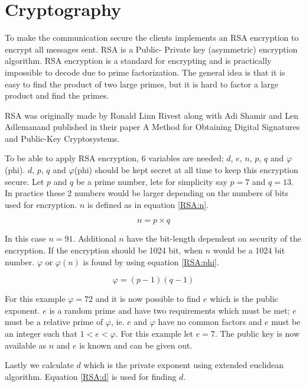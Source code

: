 \section{Cryptography}

To make the communication secure the clients implements an RSA encryption to encrypt all messages sent. RSA is a Public- Private key (asymmetric) encryption algorithm. RSA encryption is a standard for encrypting and is practically impossible to decode due to prime factorization. The general idea is that it is easy to find the product of two large primes, but it is hard to factor a large product and find the primes.

RSA was originally made by Ronald Linn Rivest along with Adi Shamir and Len Adlemanand published in their paper A Method for Obtaining Digital Signatures and Public-Key Cryptosystems\cite{RSA}.

To be able to apply RSA encryption, 6 variables are needed; $d$, $e$, $n$, $p$, $q$ and $\varphi$(phi). $d$, $p$, $q$ and $\varphi$(phi) should be kept secret at all time to keep this encryption secure. Let $p$ and $q$ be a prime number, lets for simplicity say $p=7$ and $q=13$. In practice these 2 numbers would be larger depending on the numbers of bits used for encryption. $n$ is defined as in equation \ref{RSA:n}.

\begin{equation}
n = p \times q
\label{RSA:n}
\end{equation}

In this case $n=91$. Additional $n$ have the bit-length dependent on security of the encryption. If the encryption should be 1024 bit, when $n$ would be a 1024 bit number. $\varphi$ or $\varphi(n)$ is found by using equation \ref{RSA:phi}.

\begin{equation}
\varphi = (p-1)(q-1)
\label{RSA:phi}
\end{equation}

For this example $\varphi = 72$ and it is now possible to find $e$ which is the public exponent. $e$ is a random prime and have two requirements which must be met; $e$ must be a relative prime of $\varphi$, ie. $e$ and $\varphi$ have no common factors and $e$ must be an integer such that $1 < e < \varphi$. For this example let $e=7$. The public key is now available as $n$ and $e$ is known and can be given out.

Lastly we calculate $d$ which is the private exponent using extended euclidean algorithm. Equation \ref{RSA:d} is used for finding $d$.

